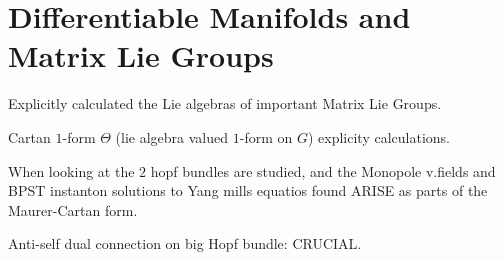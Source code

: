 \chapter{Differentiable Manifolds and Matrix Lie Groups}

Explicitly calculated the Lie algebras of important Matrix Lie Groups.

Cartan $1$-form $\Theta$ (lie algebra valued $1$-form on $G$) explicity calculations.

When looking at the $2$ hopf bundles are studied, and the Monopole v.fields and BPST instanton solutions to Yang mills equatios found ARISE as parts of the Maurer-Cartan form.


Anti-self dual connection on big Hopf bundle: CRUCIAL.

\section{}

\section{}

\section{}

\section{}

\section{}

\section{}

